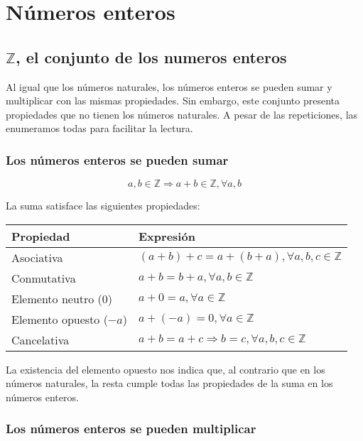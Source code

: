 \section{Números enteros}\label{numeros-enteros}

\subsection{$\mathbb{Z}$, el conjunto de los numeros enteros}

Al igual que los números naturales, los números enteros se pueden sumar y multiplicar con las mismas propiedades.
Sin embargo, este conjunto presenta propiedades que no tienen los números naturales.
A pesar de las repeticiones, las enumeramos todas para facilitar la lectura.

\subsubsection{Los números enteros se pueden sumar}

\[a,b \in\mathbb{Z} \Rightarrow a+b \in\mathbb{Z}, \forall a,b\]

La suma satisface las siguientes propiedades:

\begin{center}
\begin{tabular}{l l}
	\textbf{Propiedad}      & \textbf{Expresión}                                       \\
	\toprule
	Asociativa              & $(a+b) + c = a + (b+a), \forall a,b,c \in\mathbb{Z}$     \\
	Conmutativa             & $a+b = b+a, \forall a,b \in\mathbb{Z}$                   \\
	Elemento neutro (0)     & $a+0 = a, \forall a \in\mathbb{Z}$                       \\
	Elemento opuesto ($-a$) & $a + (-a) = 0, \forall a \in\mathbb{Z}$                  \\
	Cancelativa             & $a+b = a+c \Rightarrow b=c, \forall a,b,c \in\mathbb{Z}$ \\
\end{tabular}
\end{center}

La existencia del elemento opuesto nos indica que, al contrario que en los números naturales, la resta cumple todas las propiedades de la suma en los números enteros.

\subsubsection{Los números enteros se pueden multiplicar}

